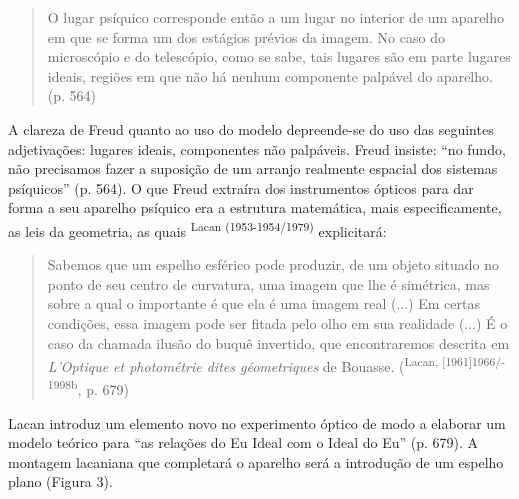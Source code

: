 \begin{multicols}{2}
\begin{quote}\par{}O lugar psíquico corresponde então a um lugar no interior de um aparelho em que se forma um dos estágios prévios da imagem.\allowbreak{} No caso do microscópio e do telescópio,\allowbreak{} como se sabe,\allowbreak{} tais lugares são em parte lugares ideais,\allowbreak{} regiões em que não há nenhum componente palpável do aparelho.\allowbreak{} (\allowbreak{}p.\allowbreak{} 564)\allowbreak{}\end{quote}\par{}A clareza de Freud quanto ao uso do modelo depreende-\allowbreak{}se do uso das seguintes adjetivações:\allowbreak{} lugares ideais,\allowbreak{} componentes não palpáveis.\allowbreak{} Freud insiste:\allowbreak{} “no fundo,\allowbreak{} não precisamos fazer a suposição de um arranjo realmente espacial dos sistemas psíquicos” (\allowbreak{}p.\allowbreak{} 564)\allowbreak{}.\allowbreak{} O que Freud extraíra dos instrumentos ópticos para dar forma a seu aparelho psíquico era a estrutura matemática,\allowbreak{} mais especificamente,\allowbreak{} as leis da geometria,\allowbreak{} as quais \textsuperscript{Lacan (\allowbreak{}1953-\allowbreak{}1954\fshyp{}1979)\allowbreak{}} explicitará:\allowbreak{}\begin{quote}\par{}Sabemos que um espelho esférico pode produzir,\allowbreak{} de um objeto situado no ponto de seu centro de curvatura,\allowbreak{} uma imagem que lhe é simétrica,\allowbreak{} mas sobre a qual o importante é que ela é uma imagem real (\allowbreak{}.\allowbreak{}.\allowbreak{}.\allowbreak{})\allowbreak{} Em certas condições,\allowbreak{} essa imagem pode ser fitada pelo olho em sua realidade (\allowbreak{}.\allowbreak{}.\allowbreak{}.\allowbreak{})\allowbreak{} É o caso da chamada ilusão do buquê invertido,\allowbreak{} que encontraremos descrita em \textit{L’Optique et photométrie dites géometriques }de Bouasse.\allowbreak{} (\allowbreak{}\textsuperscript{Lacan,\allowbreak{} [1961]1966\fshyp{}1998b},\allowbreak{} p.\allowbreak{} 679)\allowbreak{}\end{quote}\par{}Lacan introduz um elemento novo no experimento óptico de modo a elaborar um modelo teórico para “as relações do Eu Ideal com o Ideal do Eu” (\allowbreak{}p.\allowbreak{} 679)\allowbreak{}.\allowbreak{} A montagem lacaniana que completará o aparelho será a introdução de um espelho plano (\allowbreak{}Figura 3)\allowbreak{}.\allowbreak{}\par{}

\end{multicols}
